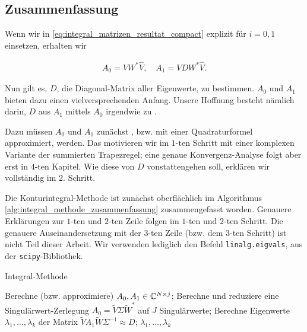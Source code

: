 \subsection*{Zusammenfassung}

Wenn wir in \eqref{eq:integral_matrizen_resultat_compact} explizit für $i = 0, 1$ einsetzen, erhalten wir

\begin{align} \label{eq:integral_matrizen_resultat}
    A_0 = V W^\ast \hat V,
    \quad
    A_1 = V D W^\ast \hat V.
\end{align}

Nun gilt es, $D$, die Diagonal-Matrix aller Eigenwerte, zu bestimmen.
$A_0$ und $A_1$ bieten dazu einen vielversprechenden Anfang.
Unsere Hoffnung besteht nämlich darin, $D$ aus $A_1$ mittels $A_0$ irgendwie zu .

Dazu müssen $A_0$ und $A_1$ zunächst , bzw. mit einer Quadraturformel approximiert, werden.
Das motivieren wir im $1$-ten Schritt mit einer komplexen Variante der summierten Trapezregel;
eine genaue Konvergenz-Analyse folgt aber erst in $4$-ten Kapitel.
Wie diese  von $D$ vonstattengehen soll, erklären wir vollständig im 2. Schritt.

Die Konturintegral-Methode ist zunächst oberflächlich im Algorithmus \ref{alg:integral_methode_zusammenfassung} zusammengefasst worden.
Genauere Erklärungen zur $1$-ten und $2$-ten Zeile folgen im $1$-ten und $2$-ten Schritt.
Die genauere Auseinandersetzung mit der $3$-ten Zeile (bzw. dem $3$-ten Schritt) ist nicht Teil dieser Arbeit.
Wir verwenden lediglich den Befehl \texttt{linalg.eigvals}, aus der \texttt{scipy}-Bibliothek.

\begin{algorithm}[H]
	\caption{Integral-Methode}
    \begin{algorithmic}[0]
            \State Berechne (bzw. approximiere) $A_0, A_1 \in \mathbb{C}^{N \times j}$;
            \State Berechne und reduziere eine Singulärwert-Zerlegung $A_0 = \tilde V \Sigma \tilde W^\ast$ auf $J$ Singulärwerte;
            \State Berechne Eigenwerte $\lambda_1, \dots, \lambda_k$ der Matrix $\tilde V A_1 \tilde W \Sigma^{-1} \approx D$;
            \State \Return $\lambda_1, \dots, \lambda_k$
		\EndProcedure
    \end{algorithmic}
    \caption{}
    \label{alg:integral_methode_zusammenfassung}
\end{algorithm}
